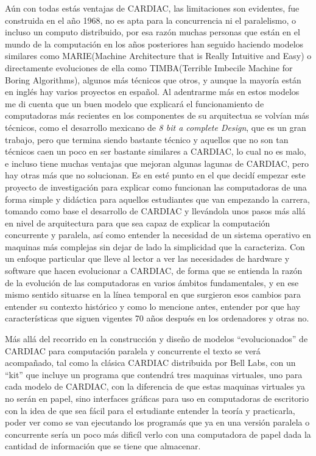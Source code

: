 \documentclass[letterpaper,12pt,oneside]{book}
\begin{document}
	Aún con todas estás ventajas de CARDIAC, las limitaciones son evidentes, fue construida en el año 1968, no es apta para la concurrencia ni el paralelismo, o 
	incluso un computo distribuido, por esa razón muchas personas que están en el mundo de la computación en los años posteriores han seguido haciendo
	modelos similares como MARIE(Machine Architecture that is Really Intuitive and Easy) o directamente evoluciones de ella como TIMBA(Terrible Imbecile Machine for Boring 
	Algorithms), algunos más técnicos que otros, y aunque la mayoría están en inglés hay varios proyectos en español. 
	Al adentrarme más en estos modelos me di cuenta que un buen modelo que explicará el funcionamiento de computadoras más recientes en los componentes de su arquitectua se volvían más técnicos, como el 
	desarrollo mexicano de \textit{8 bit a complete Design}, 
	que es un gran trabajo, pero que termina siendo bastante técnico y aquellos que no son tan técnicos caen un poco en ser bastante similares a CARDIAC, lo cual no 
	es malo, e incluso tiene muchas ventajas que mejoran algunas lagunas de CARDIAC, pero hay otras más que no solucionan. Es en esté punto en el que decidí empezar este
	proyecto de investigación para explicar como funcionan las computadoras de una forma simple y didáctica para aquellos estudiantes que van empezando la carrera,
	tomando como base el  desarrollo de CARDIAC y llevándola unos pasos más allá en nivel de arquitectura para que sea capaz de explicar
	la computación concurrente y paralela, así como entender la necesidad de un sistema operativo en maquinas más complejas sin dejar de lado la simplicidad que la 
	caracteriza.
	Con un enfoque particular que lleve al lector a ver las necesidades de hardware y software que hacen evolucionar a CARDIAC,
	de forma que se entienda la razón de la evolución de las computadoras en varios ámbitos fundamentales, y en ese mismo sentido situarse en la línea
	temporal en que surgieron esos cambios para entender su contexto histórico y como lo mencione antes, entender por que hay características  que siguen vigentes
	70 años después en los ordenadores y otras no.
	
	
	Más allá del recorrido en la construcción y diseño de modelos ``evolucionados'' de CARDIAC para computación paralela y concurrente el texto se verá acompañado,
	tal como la clásica CARDIAC distribuida por Bell Labs, con un ``kit'' que incluye un programa que contendrá tres maquinas virtuales, uno para cada
	modelo de CARDIAC, con la diferencia de que estas maquinas virtuales ya no serán en papel, sino interfaces gráficas para uso en computadoras de escritorio con la idea de que sea fácil para el estudiante
	entender la teoría y practicarla, poder ver como se van ejecutando los programás que ya en una versión paralela o concurrente sería un poco más dificíl verlo con una computadora de papel dada la cantidad de información
	que se tiene que almacenar.
\end{document}

